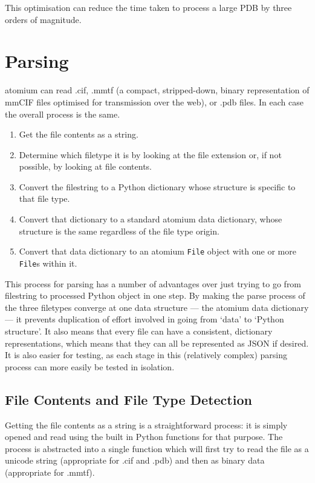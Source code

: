 This optimisation can reduce the time taken to process a large PDB by three orders of magnitude.

\section{Parsing}

atomium can read .cif, .mmtf (a compact, stripped-down, binary representation of mmCIF files optimised for transmission over the web), or .pdb files. In each case the overall process is the same.

\begin{enumerate}
   \item Get the file contents as a string.
   \item Determine which filetype it is by looking at the file extension or, if not possible, by looking at file contents.
   \item Convert the filestring to a Python dictionary whose structure is specific to that file type.
   \item Convert that dictionary to a standard atomium data dictionary, whose structure is the same regardless of the file type origin.
   \item Convert that data dictionary to an atomium \texttt{File} object with one or more \texttt{File}s within it.
\end{enumerate}

This process for parsing has a number of advantages over just trying to go from filestring to processed Python object in one step. By making the parse process of the three filetypes converge at one data structure --- the atomium data dictionary --- it prevents duplication of effort involved in going from `data' to `Python structure'. It also means that every file can have a consistent, dictionary representations, which means that they can all be represented as JSON if desired. It is also easier for testing, as each stage in this (relatively complex) parsing process can more easily be tested in isolation.

\subsection{File Contents and File Type Detection}

Getting the file contents as a string is a straightforward process: it is simply opened and read using the built in Python functions for that purpose. The process is abstracted into a single function which will first try to read the file as a unicode string (appropriate for .cif and .pdb) and then as binary data (appropriate for .mmtf).

